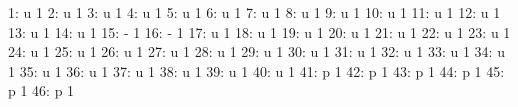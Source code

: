 \documentclass[nojss]{jss}
\begin{document}
\begin{Schunk}
\begin{Soutput}
  1:                               u                   1
  2:                               u                   1
  3:                               u                   1
  4:                               u                   1
  5:                               u                   1
  6:                               u                   1
  7:                               u                   1
  8:                               u                   1
  9:                               u                   1
 10:                               u                   1
 11:                               u                   1
 12:                               u                   1
 13:                               u                   1
 14:                               u                   1
 15:                               -                   1
 16:                               -                   1
 17:                               u                   1
 18:                               u                   1
 19:                               u                   1
 20:                               u                   1
 21:                               u                   1
 22:                               u                   1
 23:                               u                   1
 24:                               u                   1
 25:                               u                   1
 26:                               u                   1
 27:                               u                   1
 28:                               u                   1
 29:                               u                   1
 30:                               u                   1
 31:                               u                   1
 32:                               u                   1
 33:                               u                   1
 34:                               u                   1
 35:                               u                   1
 36:                               u                   1
 37:                               u                   1
 38:                               u                   1
 39:                               u                   1
 40:                               u                   1
 41:                               p                   1
 42:                               p                   1
 43:                               p                   1
 44:                               p                   1
 45:                               p                   1
 46:                               p                   1

\end{Soutput}
\end{Schunk}
\end{document}

